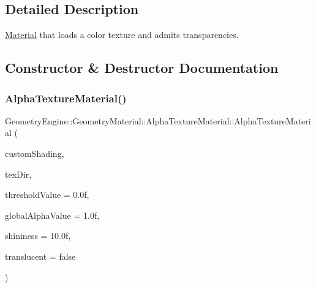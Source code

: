 \subsection{Detailed Description}
\mbox{\hyperlink{class_geometry_engine_1_1_geometry_material_1_1_material}{Material}} that loads a color texture and admits transparencies. 

\subsection{Constructor \& Destructor Documentation}
\mbox{\label{class_geometry_engine_1_1_geometry_material_1_1_alpha_texture_material_a13e251b89fd08e38647572695196c5b6}} 
\subsubsection{\texorpdfstring{AlphaTextureMaterial()}{AlphaTextureMaterial()}\hspace{0.1cm}{\footnotesize\ttfamily [1/3]}}
{\footnotesize\ttfamily Geometry\+Engine\+::\+Geometry\+Material\+::\+Alpha\+Texture\+Material\+::\+Alpha\+Texture\+Material (\begin{DoxyParamCaption}\item[{const \mbox{\hyperlink{class_geometry_engine_1_1_custom_shading_1_1_custom_shading_interface}{Custom\+Shading\+::\+Custom\+Shading\+Interface}} $\ast$const}]{custom\+Shading,  }\item[{const std\+::string \&}]{tex\+Dir,  }\item[{float}]{threshold\+Value = {\ttfamily 0.0f},  }\item[{float}]{global\+Alpha\+Value = {\ttfamily 1.0f},  }\item[{float}]{shininess = {\ttfamily 10.0f},  }\item[{bool}]{translucent = {\ttfamily false} }\end{DoxyParamCaption})}

